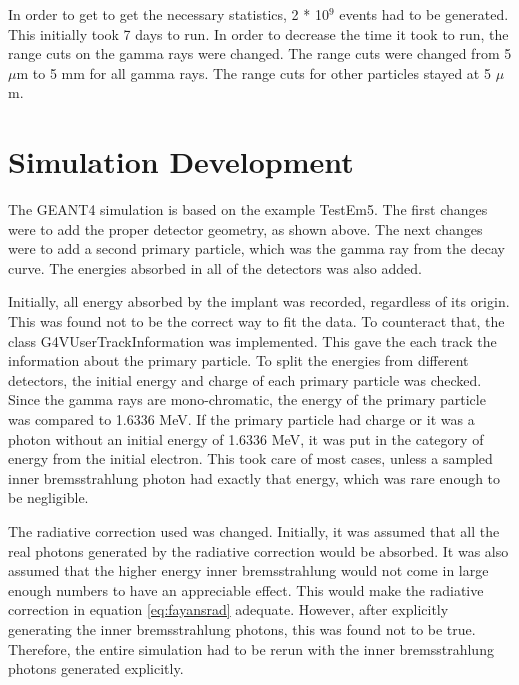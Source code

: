 \documentclass[main.tex]{subfiles}
\begin{document}
In order to get to get the necessary statistics, 2 * 10$^{9}$ events had to be generated. 
This initially took 7 days to run. 
In order to decrease the time it took to run, the range cuts on the gamma rays were changed.
The range cuts were changed from 5 $\mu$m to 5 mm for all gamma rays.
The range cuts for other particles stayed at 5 $\mu$m.

\section{Simulation Development}
The GEANT4 simulation is based on the example TestEm5.
The first changes were to add the proper detector geometry, as shown above.
The next changes were to add a second primary particle, which was the gamma ray from the decay curve.
The energies absorbed in all of the detectors was also added.

Initially, all energy absorbed by the implant was recorded, regardless of its origin.
This was found not to be the correct way to fit the data.
To counteract that, the class G4VUserTrackInformation was implemented.
This gave the each track the information about the primary particle.
To split the energies from different detectors, the initial energy and charge of each primary particle was checked.
Since the gamma rays are mono-chromatic, the energy of the primary particle was compared to 1.6336 MeV.
If the primary particle had charge or it was a photon without an initial energy of 1.6336 MeV, it was put in the category of energy from the initial electron. 
This took care of most cases, unless a sampled inner bremsstrahlung photon had exactly that energy, which was rare enough to be negligible.

The radiative correction used was changed.
Initially, it was assumed that all the real photons generated by the radiative correction would be absorbed.
It was also assumed that the higher energy inner bremsstrahlung would not come in large enough numbers to have an appreciable effect. 
This would make the radiative correction in equation \ref{eq:fayansrad} adequate. 
However, after explicitly generating the inner bremsstrahlung photons, this was found not to be true.
Therefore, the entire simulation had to be rerun with the inner bremsstrahlung photons generated explicitly.
\end{document}
